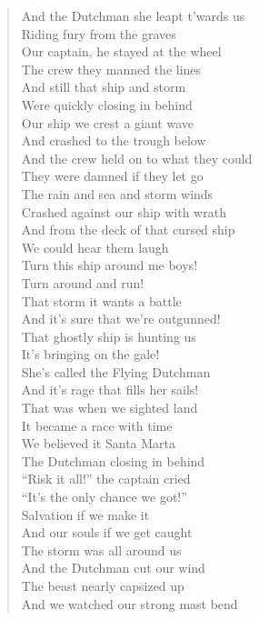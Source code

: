 \documentclass[11pt]{article}
\begin{document}
\begin{verse}
And the Dutchman she leapt t'wards us\\
Riding fury from the graves\\
Our captain, he stayed at the wheel\\
The crew they manned the lines\\
And still that ship and storm\\
Were quickly closing in behind\\
Our ship we crest a giant wave\\
And crashed to the trough below\\
And the crew held on to what they could\\
They were damned if they let go\\
The rain and sea and storm winds\\
Crashed against our ship with wrath\\
And from the deck of that cursed ship\\
We could hear them laugh\\
\vspace*{1em}
Turn this ship around me boys!\\
Turn around and run!\\
That storm it wants a battle\\
And it's sure that we're outgunned!\\
That ghostly ship is hunting us\\
It's bringing on the gale!\\
She's called the Flying Dutchman\\
And it's rage that fills her sails!\\
\vspace*{1em}
That was when we sighted land\\
It became a race with time\\
We believed it Santa Marta\\
The Dutchman closing in behind\\
``Risk it all!'' the captain cried\\
``It's the only chance we got!''\\
Salvation if we make it\\
And our souls if we get caught\\
The storm was all around us\\
And the Dutchman cut our wind\\
The beast nearly capsized up\\
And we watched our strong mast bend\\

\end{verse}
\end{document}
